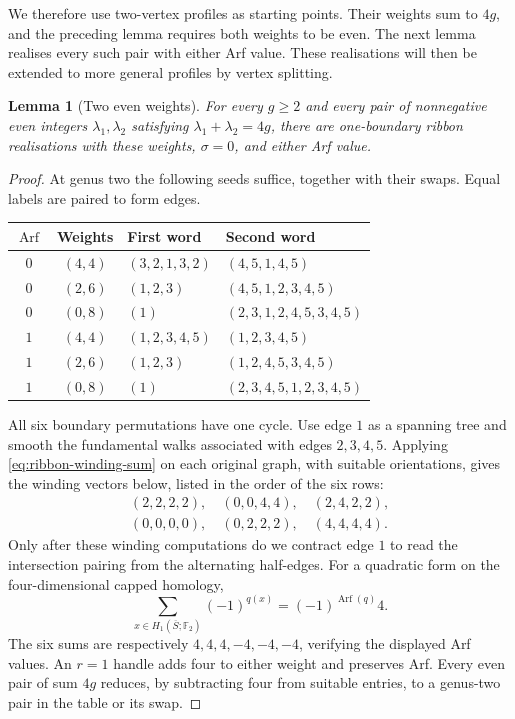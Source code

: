 \documentclass[11pt]{amsart}
\theoremstyle{definition}
\theoremstyle{plain}
\newtheorem{lemma}[lemma]{Lemma}
\theoremstyle{definition}
\theoremstyle{definition}
\newcommand{\Arf}{\operatorname{Arf}}
\begin{document}
We therefore use two-vertex profiles as starting points.
Their weights sum to $4g$, and the preceding lemma
requires both weights to be even. The next lemma
realises every such pair with either Arf value.
These realisations will then be extended to more
general profiles by vertex splitting.


\begin{lemma}[Two even weights]
\label{lem:classification-two-even}
For every $g\geq2$ and every pair of nonnegative even integers
$\lambda_1,\lambda_2$ satisfying $\lambda_1+\lambda_2=4g$, there are
one-boundary ribbon realisations with these weights, $\sigma=0$,
and either Arf value.
\end{lemma}
\begin{proof}
At genus two the following seeds suffice, together with their swaps.
Equal labels are paired to form edges.
\begin{center}
\small
\renewcommand{\arraystretch}{1.12}
\begin{tabular}{@{}ccll@{}}
$\Arf$ & Weights & First word & Second word\\ \hline
$0$ & $(4,4)$ & $(3,2,1,3,2)$ & $(4,5,1,4,5)$\\
$0$ & $(2,6)$ & $(1,2,3)$ & $(4,5,1,2,3,4,5)$\\
$0$ & $(0,8)$ & $(1)$ & $(2,3,1,2,4,5,3,4,5)$\\
$1$ & $(4,4)$ & $(1,2,3,4,5)$ & $(1,2,3,4,5)$\\
$1$ & $(2,6)$ & $(1,2,3)$ & $(1,2,4,5,3,4,5)$\\
$1$ & $(0,8)$ & $(1)$ & $(2,3,4,5,1,2,3,4,5)$
\end{tabular}
\end{center}
All six boundary permutations have one cycle.  Use edge $1$ as a
spanning tree and smooth the fundamental walks associated with
edges $2,3,4,5$.  Applying \eqref{eq:ribbon-winding-sum} on each
original graph, with suitable orientations, gives the winding
vectors below, listed in the order of the six rows:
\[
\begin{gathered}
 (2,2,2,2),\quad(0,0,4,4),\quad(2,4,2,2),\\
 (0,0,0,0),\quad(0,2,2,2),\quad(4,4,4,4).
\end{gathered}
\]
Only after these winding computations do we contract edge $1$
to read the intersection pairing from the alternating half-edges.  For a quadratic form on the four-dimensional capped homology,
\[
 \sum_{x\in H_1(\overline S;\mathbb F_2)}(-1)^{q(x)}
 =(-1)^{\Arf(q)}4.
\]
The six sums are respectively $4,4,4,-4,-4,-4$, verifying the
displayed Arf values.
An $r=1$ handle adds four to either weight and preserves Arf.
Every even pair of sum $4g$ reduces, by subtracting four from suitable
entries, to a genus-two pair in the table or its swap.
\end{proof}
\end{document}
